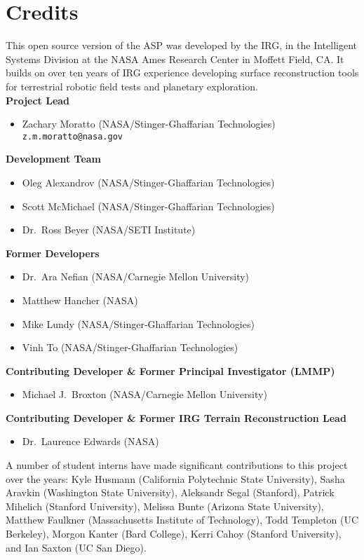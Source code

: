 
\chapter*{Credits}

This open source version of the \ac{ASP} was developed by the
\ac{IRG}, in the Intelligent Systems Division at the \ac{NASA} Ames
Research Center in Moffett Field, CA. It builds on over ten years
of IRG experience developing surface reconstruction tools for
terrestrial robotic field tests and planetary exploration. \\

{\bf Project Lead}
\begin {itemize}
\item Zachary Moratto (NASA/Stinger-Ghaffarian Technologies)\\ {\tt z.m.moratto@nasa.gov}
\end{itemize}

{\bf Development Team}
\begin{itemize}
\item Oleg Alexandrov (NASA/Stinger-Ghaffarian Technologies)
\item Scott McMichael (NASA/Stinger-Ghaffarian Technologies)
\item Dr.~Ross Beyer (NASA/SETI Institute)
\end{itemize}

{\bf Former Developers}
\begin{itemize}
\item Dr.~Ara Nefian (NASA/Carnegie Mellon University)
\item Matthew Hancher (NASA)
\item Mike Lundy (NASA/Stinger-Ghaffarian Technologies)
\item Vinh To (NASA/Stinger-Ghaffarian Technologies)
\end{itemize}

{\bf Contributing Developer \& Former Principal Investigator (LMMP)}
\begin{itemize}
\item Michael J.~Broxton (NASA/Carnegie Mellon University)
\end{itemize}

{\bf Contributing Developer \& Former IRG Terrain Reconstruction Lead}
\begin{itemize}
\item Dr.\ Laurence Edwards (NASA)
\end{itemize}

A number of student interns have made significant contributions to
this project over the years: Kyle Husmann (California Polytechnic
State University), Sasha Aravkin (Washington State University),
Aleksandr Segal (Stanford), Patrick Mihelich (Stanford University),
Melissa Bunte (Arizona State University), Matthew Faulkner
(Massachusetts Institute of Technology), Todd Templeton (UC Berkeley),
Morgon Kanter (Bard College), Kerri Cahoy (Stanford University), and
Ian Saxton (UC San Diego).

